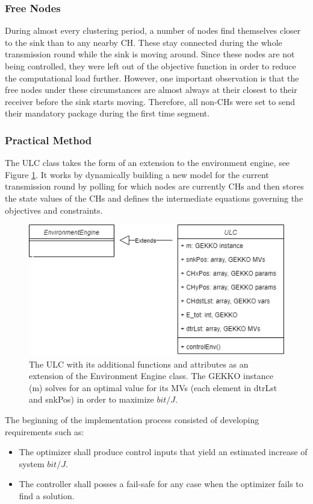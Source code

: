 \subsubsection{Free Nodes}
During almost every clustering period, a number of nodes find themselves closer to the sink than to any nearby CH. These stay connected during the whole transmission round while the sink is moving around. Since these nodes are not being controlled, they were left out of the objective function in order to reduce the computational load further. However, one important observation is that the free nodes under these circumstances are almost always at their closest to their receiver before the sink starts moving. Therefore, all non-CHs were set to send their mandatory package during the first time segment.

\subsubsection*{Practical Method}
The ULC class takes the form of an extension to the environment engine, see Figure \ref{fig:ULCUML}. It works by dynamically building a new model for the current transmission round by polling for which nodes are currently CHs and then stores the state values of the CHs and defines the intermediate equations governing the objectives and constraints. \newline 

\begin{figure}
    \centering
    \includegraphics[scale = 0.45]{Images/ULCUML.png}
    \caption{The ULC with its additional functions and attributes as an extension of the Environment Engine class. The GEKKO instance (m) solves for an optimal value for its MVs (each element in dtrLst and snkPos) in order to maximize $bit/J$.}
    \label{fig:ULCUML}
\end{figure}

\noindent The beginning of the implementation process consisted of developing requirements such as:
\begin{itemize}
    \item The optimizer shall produce control inputs that yield an estimated increase of system $bit/J$.
    \item The controller shall posses a fail-safe for any case when the optimizer fails to find a solution.
\end{itemize}

